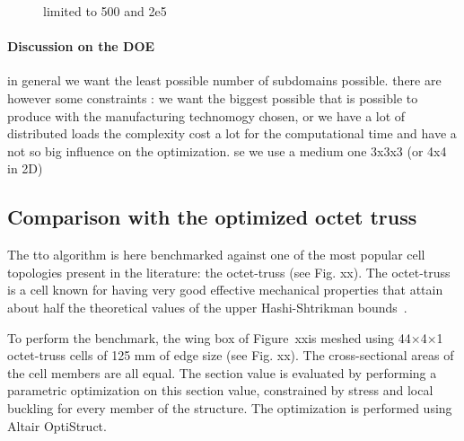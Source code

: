 \begin{figure}
    \hfill
    \hspace*{\fill}
    \caption{limited to 500 and 2e5}
    \label{fig:05}
\end{figure}

\paragraph{Discussion on the DOE}
in general we want the least possible number of subdomains possible. there are however some constraints : we want the biggest possible that is possible to produce with the manufacturing technomogy chosen, or we have a lot of distributed loads
the complexity cost a lot for the computational time and have a not so big influence on the optimization. se we use a medium one 3x3x3 (or 4x4 in 2D)

\subsection{Comparison with the optimized octet truss}

The \gls{tto} algorithm is here benchmarked against one of the most popular cell topologies present in the literature: the octet-truss (see Fig. xx). The octet-truss is a cell known for having very good effective mechanical properties that attain about half the theoretical values of the upper Hashi-Shtrikman bounds~. 

To perform the benchmark, the wing box of Figure~xxis meshed using 44×4×1 octet-truss cells of 125 mm of edge size (see Fig. xx). The cross-sectional areas of the cell members are all equal. The section value is evaluated by performing a parametric optimization on this section value, constrained by stress and local buckling for every member of the structure. The optimization is performed using Altair OptiStruct.

